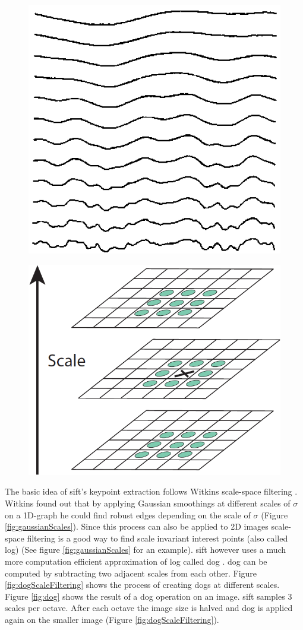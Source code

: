 \begin{figure}
	\centering
	\begin{minipage}{.5\textwidth}
		\centering
		\includegraphics[width=0.45\linewidth]{figures/theorySIFT_scaleSpaceFiltering}
		\label{fig:scaleSpaceFiltering}
	\end{minipage}%
	\begin{minipage}{.5\textwidth}
			\centering
			\includegraphics[width=0.45\linewidth]{figures/theorySIFT_interestPointDetection}
			\label{fig:interestPointDetection}
	\end{minipage}	
\end{figure}


The basic idea of \gls{sift}'s keypoint extraction follows Witkins scale-space filtering \cite{Witkin1983}. Witkins found out that by applying Gaussian smoothings at different scales of $\sigma$ on a 1D-graph he could find robust edges depending on the scale of $\sigma$ {(Figure \ref{fig:gaussianScales})}. Since this process can also be applied to 2D images scale-space filtering is a good way to find scale invariant interest points {(also called \gls{log})} {(See figure \ref{fig:gaussianScales} for an example)}. \gls{sift} however uses a much more computation efficient approximation of \gls{log} called \acrfull{dog} \cite{Lowe2004}. \gls{dog} can be computed by subtracting two adjacent scales from each other. Figure \ref{fig:dogScaleFiltering} shows the process of creating \glspl{dog} at different scales. Figure \ref{fig:dog} shows the result of a \gls{dog} operation on an image. \gls{sift} samples 3 scales per octave. After each octave the image size is halved and \gls{dog} is applied again on the smaller image {(Figure \ref{fig:dogScaleFiltering})}.

